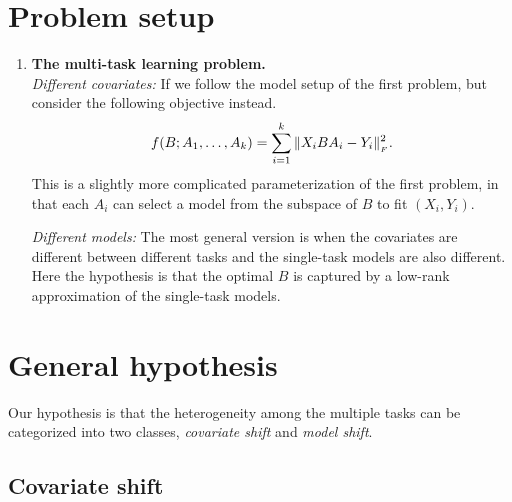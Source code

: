 \section{Problem setup}

\begin{enumerate}
  \item {\bf The multi-task learning problem.} \\
    {\it Different covariates:}
    If we follow the model setup of the first problem, but consider the following objective instead.
    \begin{align}
        f(B; A_1, \dots, A_k) = \sum_{i=1}^k \|X_i B A_i - Y_i\|_{_{F}}^2.
    \end{align}
    This is a slightly more complicated parameterization of the first problem, in that each $A_i$ can select a model from the subspace of $B$ to fit $(X_i, Y_i)$.

    {\it Different models:} The most general version is when the covariates are different between different tasks and the single-task models are also different.
    Here the hypothesis is that the optimal $B$ is captured by a low-rank approximation of the single-task models.
\end{enumerate}

\section{General hypothesis}

Our hypothesis is that the heterogeneity among the multiple tasks can be categorized into two classes, \textit{covariate shift} and \textit{model shift}. 

\subsection{Covariate shift}

